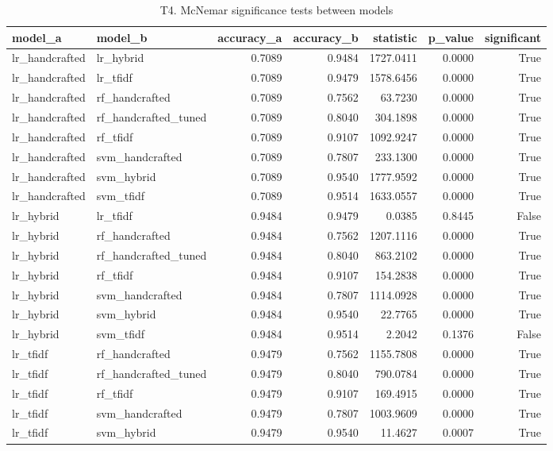 \begin{table}
\caption{T4. McNemar significance tests between models}
\begin{tabular}{llrrrrr}
\toprule
model_a & model_b & accuracy_a & accuracy_b & statistic & p_value & significant \\
\midrule
lr_handcrafted & lr_hybrid & 0.7089 & 0.9484 & 1727.0411 & 0.0000 & True \\
lr_handcrafted & lr_tfidf & 0.7089 & 0.9479 & 1578.6456 & 0.0000 & True \\
lr_handcrafted & rf_handcrafted & 0.7089 & 0.7562 & 63.7230 & 0.0000 & True \\
lr_handcrafted & rf_handcrafted_tuned & 0.7089 & 0.8040 & 304.1898 & 0.0000 & True \\
lr_handcrafted & rf_tfidf & 0.7089 & 0.9107 & 1092.9247 & 0.0000 & True \\
lr_handcrafted & svm_handcrafted & 0.7089 & 0.7807 & 233.1300 & 0.0000 & True \\
lr_handcrafted & svm_hybrid & 0.7089 & 0.9540 & 1777.9592 & 0.0000 & True \\
lr_handcrafted & svm_tfidf & 0.7089 & 0.9514 & 1633.0557 & 0.0000 & True \\
lr_hybrid & lr_tfidf & 0.9484 & 0.9479 & 0.0385 & 0.8445 & False \\
lr_hybrid & rf_handcrafted & 0.9484 & 0.7562 & 1207.1116 & 0.0000 & True \\
lr_hybrid & rf_handcrafted_tuned & 0.9484 & 0.8040 & 863.2102 & 0.0000 & True \\
lr_hybrid & rf_tfidf & 0.9484 & 0.9107 & 154.2838 & 0.0000 & True \\
lr_hybrid & svm_handcrafted & 0.9484 & 0.7807 & 1114.0928 & 0.0000 & True \\
lr_hybrid & svm_hybrid & 0.9484 & 0.9540 & 22.7765 & 0.0000 & True \\
lr_hybrid & svm_tfidf & 0.9484 & 0.9514 & 2.2042 & 0.1376 & False \\
lr_tfidf & rf_handcrafted & 0.9479 & 0.7562 & 1155.7808 & 0.0000 & True \\
lr_tfidf & rf_handcrafted_tuned & 0.9479 & 0.8040 & 790.0784 & 0.0000 & True \\
lr_tfidf & rf_tfidf & 0.9479 & 0.9107 & 169.4915 & 0.0000 & True \\
lr_tfidf & svm_handcrafted & 0.9479 & 0.7807 & 1003.9609 & 0.0000 & True \\
lr_tfidf & svm_hybrid & 0.9479 & 0.9540 & 11.4627 & 0.0007 & True \\

\end{tabular}
\end{table}
